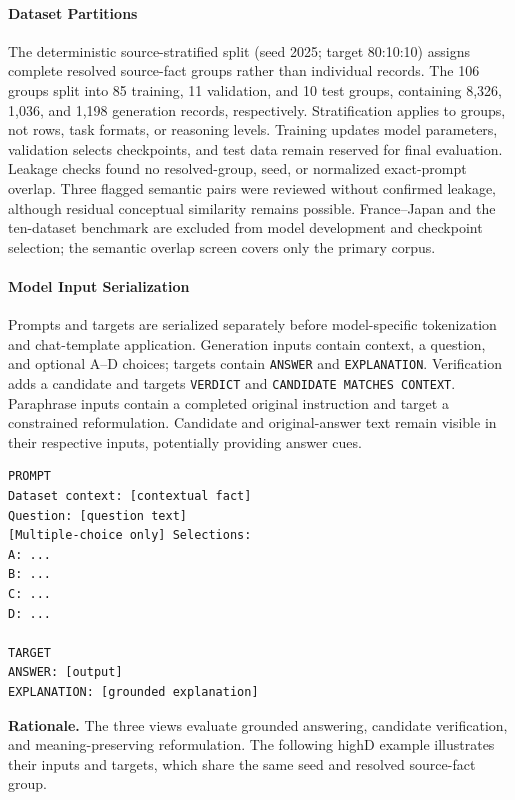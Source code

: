 \documentclass[a4paper,fleqn]{cas-sc}
\begin{document}
\paragraph{Dataset Partitions}
The deterministic source-stratified split (seed 2025; target 80:10:10) assigns complete resolved source-fact groups rather than individual records. The 106 groups split into 85 training, 11 validation, and 10 test groups, containing 8,326, 1,036, and 1,198 generation records, respectively. Stratification applies to groups, not rows, task formats, or reasoning levels. Training updates model parameters, validation selects checkpoints, and test data remain reserved for final evaluation. Leakage checks found no resolved-group, seed, or normalized exact-prompt overlap. Three flagged semantic pairs were reviewed without confirmed leakage, although residual conceptual similarity remains possible. France--Japan and the ten-dataset benchmark are excluded from model development and checkpoint selection; the semantic overlap screen covers only the primary corpus.

\paragraph{Model Input Serialization}
Prompts and targets are serialized separately before model-specific tokenization and chat-template application. Generation inputs contain context, a question, and optional A--D choices; targets contain \texttt{ANSWER} and \texttt{EXPLANATION}. Verification adds a candidate and targets \texttt{VERDICT} and \texttt{CANDIDATE MATCHES CONTEXT}. Paraphrase inputs contain a completed original instruction and target a constrained reformulation. Candidate and original-answer text remain visible in their respective inputs, potentially providing answer cues.

\newpage
\begin{lstlisting}[style=Matlab-editor]
PROMPT
Dataset context: [contextual fact]
Question: [question text]
[Multiple-choice only] Selections:
A: ...
B: ...
C: ...
D: ...

TARGET
ANSWER: [output]
EXPLANATION: [grounded explanation]
\end{lstlisting}

\textbf{Rationale.}
The three views evaluate grounded answering, candidate verification, and meaning-preserving reformulation. The following highD example illustrates their inputs and targets, which share the same seed and resolved source-fact group.
\end{document}
